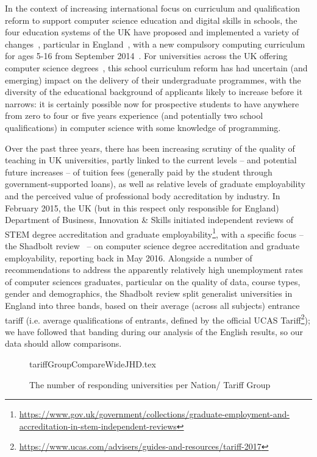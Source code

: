 \documentclass[english,submission]{programming}
\begin{document}
In the context of increasing international focus on curriculum and
qualification reform to support computer science education and digital
skills in schools, the four education systems of the UK have proposed
and implemented a variety of
changes~\cite{rs:2012,brown-et-al-sigcse2013,crick+moller-wipsce2015},
particular in England~\cite{brown-et-al-toce2014}, with a new
compulsory computing curriculum for ages 5-16 from September
2014~\cite{dfecomp:2013}. For universities across the UK offering
computer science degrees~\cite{qaacomp:2016}, this school curriculum
reform has had uncertain (and emerging) impact on the delivery of
their undergraduate programmes, with the diversity of the educational
background of applicants likely to increase before it narrows: it is
certainly possible now for prospective students to have anywhere from
zero to four or five years experience (and potentially two school
qualifications) in computer science with some knowledge of
programming.

Over the past three years, there has been increasing scrutiny of the
quality of teaching in UK universities, partly linked to the current
levels -- and potential future increases -- of tuition fees (generally
paid by the student through government-supported loans), as well as
relative levels of graduate employability and the perceived value of
professional body accreditation by industry. In February 2015, the UK
(but in this respect only responsible for England) Department of
Business, Innovation \& Skills initiated independent reviews of STEM
degree accreditation and graduate
employability\footnote{\url{https://www.gov.uk/government/collections/graduate-employment-and-accreditation-in-stem-independent-reviews}},
with a specific focus -- the Shadbolt review~\cite{shadbolt:2016} --
on computer science degree accreditation and graduate employability,
reporting back in May 2016. Alongside a number of recommendations to
address the apparently relatively high unemployment rates of computer sciences
graduates, particular on the quality of data, course types, gender and
demographics, the Shadbolt review split generalist universities in
England into three bands, based on their average (across all subjects)
entrance tariff (i.e. average qualifications of entrants, defined by the
official UCAS
Tariff\footnote{\url{https://www.ucas.com/advisers/guides-and-resources/tariff-2017}});
we have followed that banding during our analysis of the English
results, so our data should allow comparisons.

\begin{figure}
\begin{center}
{tariffGroupCompareWideJHD.tex}
\caption{The number of responding universities per Nation/   
 Tariff Group\label{fig:TG}}
\end{center}
\end{figure}
\end{document}
